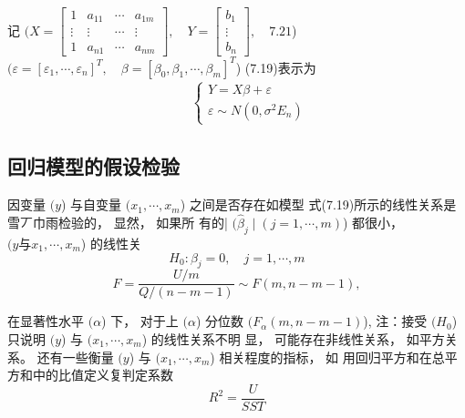 记 $( X=\left[\begin{array}{cccc}1 & a_{11} & \cdots & a_{1 m} \\ \vdots & \vdots & \cdots & \vdots \\ 1 & a_{n 1} & \cdots & a_{n m}\end{array}\right], \quad Y=\left[\begin{array}{c}b_{1} \\ \vdots \\ b_{n}\end{array}\right], \quad {7 . 2 1} $)
$( \varepsilon=\left[\varepsilon_{1}, \cdots, \varepsilon_{n}\right]^{T}, \quad \beta=\left[\beta_{0}, \beta_{1}, \cdots, \beta_{m}\right]^{T} $)
(7.19)表示为
\begin{equation}
\begin{array}{l}

\qquad\left\{\begin{array}{l}
{Y}={X} {\beta}+{\varepsilon} \\
{\varepsilon} \sim {N}\left({0}, \sigma^{2} {E}_{n}\right)
\end{array}\right.
\end{array}
\end{equation}

\subsection{回归模型的假设检验}

因变量 $( y $) 与自变量 $( x_{1}, \cdots, x_{m} $) 之间是否存在如模型 式(7.19)所示的线性关系是雪丆巾雨检验的， 显然， 如果所 有的| $( \hat{\beta}_{j} \mid(j=1, \cdots, m) $) 都很小， $( y 与 x_{1}, \cdots, x_{m} $) 的线性关
\begin{equation}
H_{0}: \beta_{j}=0, \quad j=1, \cdots, m
\end{equation}
\begin{equation}
F=\frac{U / m}{Q /(n-m-1)} \sim F(m, n-m-1),
\end{equation}

在显著性水平 $( \alpha $) 下， 对于上 $( \alpha $) 分位数 $( {F}_{\alpha}({m}, {n}-{m}-{1}) $),
注：接受 $( {H}_{0} $) 只说明 $( {y} $) 与 $( {x}_{1}, \cdots, {x}_{m} $) 的线性关系不明
显， 可能存在非线性关系， 如平方关系。  还有一些衡量 $( y $) 与 $( x_{1}, \cdots, x_{m} $) 相关程度的指标， 如 用回归平方和在总平方和中的比值定义复判定系数
\begin{equation}
{R}^{2}=\frac{{U}}{{S S T}}
\end{equation}

